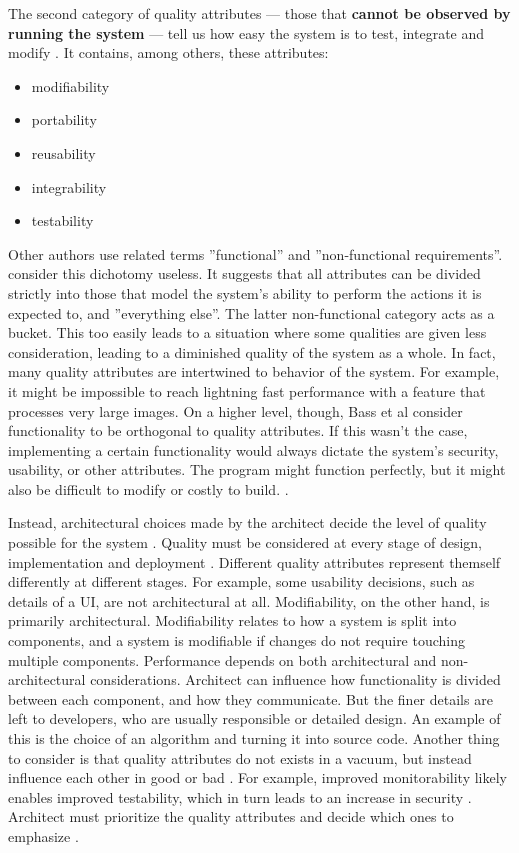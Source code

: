 \documentclass[utf8,english]{gradu3}
\begin{document}
The second category of quality attributes --- those that \textbf{cannot be observed by
  running the system} --- tell us how easy the system is to test, integrate and
modify \parencite[81]{Bass1998}. It contains, among others, these attributes:
\begin{itemize}
  \item modifiability
  \item portability
  \item reusability
  \item integrability
  \item testability
\end{itemize}

Other authors use related terms ''functional'' and ''non-functional requirements''.
\textcite[76]{Bass1998} consider this dichotomy useless. It
suggests that all attributes can be divided strictly into those that model the
system's ability to perform the actions it is expected to, and ''everything
else''. The latter non-functional category acts as a bucket. This too easily
leads to a situation where some qualities are given less consideration, leading
to a diminished quality of the system as a whole. In fact, many quality
attributes are intertwined to behavior of the system. For example, it might be
impossible to reach lightning fast performance with a feature that processes
very large images. On a higher level, though, Bass et al consider functionality
to be orthogonal to quality attributes. If this wasn't the case, implementing a
certain functionality would always dictate the system's security, usability, or
other attributes. The program might function perfectly, but it might
also be difficult to modify or costly to build. \parencite[77]{Bass1998}.

Instead, architectural choices made by the architect decide the level of quality
possible for the system \parencite[72]{Bass2003}. Quality must be considered at every
stage of design, implementation and deployment \parencite{Bass1998}. Different quality
attributes represent themself differently at different stages. For example, some
usability decisions, such as details of a UI, are not architectural at all.
Modifiability, on the other hand, is primarily architectural. Modifiability
relates to how a system is split into components, and a system is modifiable if
changes do not require touching multiple components. Performance depends on both
architectural and non-architectural considerations. Architect can influence how
functionality is divided between each component, and how they communicate. But
the finer details are left to developers, who are usually responsible or
detailed design. An example of this is the choice of an algorithm and turning it
into source code. Another thing to consider is that quality attributes do not
exists in a vacuum, but instead influence each other in good or bad \parencite[78]{Bass1998}.
For example, improved monitorability likely enables improved testability,
which in turn leads to an increase in security \parencite[18]{Li2021}. Architect must
prioritize the quality attributes and decide which ones to emphasize
\parencite[129]{Bass1998}.
\end{document}
